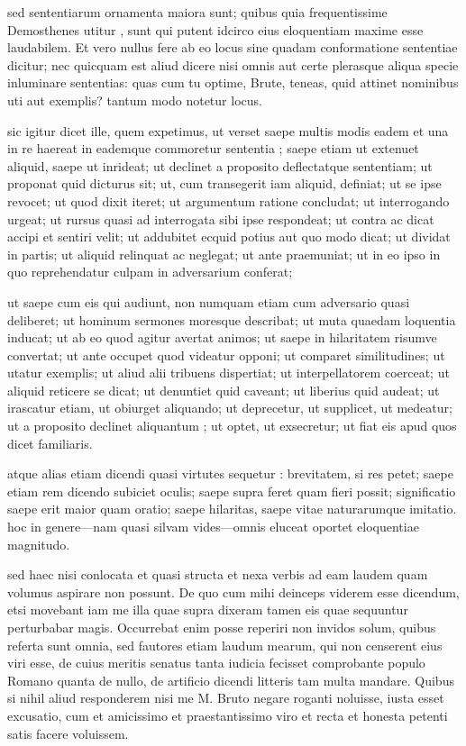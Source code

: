 sed sententiarum ornamenta maiora sunt; quibus quia frequentissime Demosthenes utitur , sunt qui putent idcirco eius eloquentiam maxime esse laudabilem. Et vero nullus fere ab eo locus sine quadam conformatione sententiae dicitur; nec quicquam est aliud dicere nisi omnis aut certe plerasque aliqua specie inluminare sententias: quas cum tu optime, Brute, teneas, quid attinet nominibus uti aut exemplis? tantum modo notetur locus.

 sic igitur dicet ille, quem expetimus, ut verset saepe multis modis eadem et una in re haereat in eademque commoretur sententia ; saepe etiam ut extenuet aliquid, saepe ut inrideat; ut declinet a proposito deflectatque sententiam; ut proponat quid dicturus sit; ut, cum transegerit iam aliquid, definiat; ut se ipse revocet; ut quod dixit iteret; ut argumentum ratione concludat; ut interrogando urgeat; ut rursus quasi ad interrogata sibi ipse respondeat; ut contra ac dicat accipi et sentiri velit; ut addubitet ecquid potius aut quo modo dicat; ut dividat in partis; ut aliquid relinquat ac neglegat; ut ante praemuniat; ut in eo ipso in quo reprehendatur culpam in adversarium conferat;

 ut saepe cum eis qui audiunt, non numquam etiam cum adversario quasi deliberet; ut hominum sermones moresque describat; ut muta quaedam loquentia inducat; ut ab eo quod agitur avertat animos; ut saepe in hilaritatem risumve convertat; ut ante occupet quod videatur opponi; ut comparet similitudines; ut utatur exemplis; ut aliud alii tribuens dispertiat; ut interpellatorem coerceat; ut aliquid reticere se dicat; ut denuntiet quid caveant; ut liberius quid audeat; ut irascatur etiam, ut obiurget aliquando; ut deprecetur, ut supplicet, ut medeatur; ut a proposito declinet aliquantum ; ut optet, ut exsecretur; ut fiat eis apud quos dicet familiaris.

 atque alias etiam dicendi quasi virtutes sequetur : brevitatem, si res petet; saepe etiam rem dicendo subiciet oculis; saepe supra feret quam fieri possit; significatio saepe erit maior quam oratio; saepe hilaritas, saepe vitae naturarumque imitatio. hoc in genere—nam quasi silvam vides—omnis eluceat oportet eloquentiae magnitudo.

 sed haec nisi conlocata et quasi structa et nexa verbis ad eam laudem quam volumus aspirare non possunt. De quo cum mihi deinceps viderem esse dicendum, etsi movebant iam me illa quae supra dixeram tamen eis quae sequuntur perturbabar magis. Occurrebat enim posse reperiri non invidos solum, quibus referta sunt omnia, sed fautores etiam laudum mearum, qui non censerent eius viri esse, de cuius meritis senatus tanta iudicia fecisset comprobante populo Romano quanta de nullo, de artificio dicendi litteris tam multa mandare. Quibus si nihil aliud responderem nisi me M. Bruto negare roganti noluisse, iusta esset excusatio, cum et amicissimo et praestantissimo viro et recta et honesta petenti satis facere voluissem.

